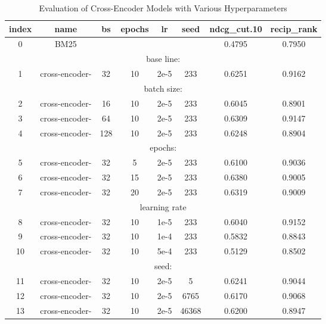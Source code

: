 \begin{table}[h!]
\centering
\begin{tabular}{|c|c|c|c|c|c|c|c|}
\hline
index & name & bs & epochs & lr & seed & ndcg\_cut.10 & recip\_rank \\
\hline
0 & BM25 & & & & & 0.4795 & 0.7950 \\
\hline
\multicolumn{8}{|c|}{base line:} \\
\hline
1 & cross-encoder- & 32 & 10 & 2e-5 & 233 & 0.6251 & 0.9162 \\
\hline
\multicolumn{8}{|c|}{batch size:} \\
\hline
2 & cross-encoder- & 16 & 10 & 2e-5 & 233 & 0.6045 & 0.8901 \\
3 & cross-encoder- & 64 & 10 & 2e-5 & 233 & 0.6309 & 0.9147 \\
4 & cross-encoder- & 128 & 10 & 2e-5 & 233 & 0.6248 & 0.8904 \\
\hline
\multicolumn{8}{|c|}{epochs:} \\
\hline
5 & cross-encoder- & 32 & 5 & 2e-5 & 233 & 0.6100 & 0.9036 \\
6 & cross-encoder- & 32 & 15 & 2e-5 & 233 & 0.6380 & 0.9005 \\
7 & cross-encoder- & 32 & 20 & 2e-5 & 233 & 0.6319 & 0.9009 \\
\hline
\multicolumn{8}{|c|}{learning rate} \\
\hline
8 & cross-encoder- & 32 & 10 & 1e-5 & 233 & 0.6040 & 0.9152 \\
9 & cross-encoder- & 32 & 10 & 1e-4 & 233 & 0.5832 & 0.8843 \\
10 & cross-encoder- & 32 & 10 & 5e-4 & 233 & 0.5129 & 0.8502 \\
\hline
\multicolumn{8}{|c|}{seed:} \\
\hline
11 & cross-encoder- & 32 & 10 & 2e-5 & 5 & 0.6241 & 0.9044 \\
12 & cross-encoder- & 32 & 10 & 2e-5 & 6765 & 0.6170 & 0.9068 \\
13 & cross-encoder- & 32 & 10 & 2e-5 & 46368 & 0.6200 & 0.8947 \\
\hline
\end{tabular}
\caption{Evaluation of Cross-Encoder Models with Various Hyperparameters}
\label{table:cross_encoder}
\end{table}

